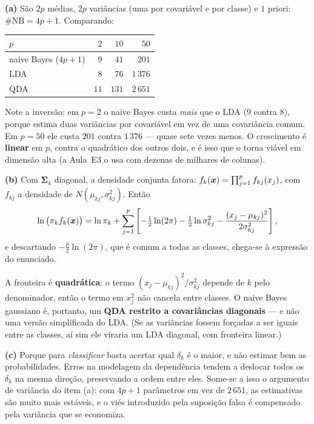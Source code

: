 \documentclass[11pt,a4paper]{article}
\begin{document}
\begin{solucao}
\textbf{(a)} São $2p$ médias, $2p$ variâncias (uma por covariável e por classe) e
$1$ priori: $\#\text{NB}=4p+1$. Comparando:
\begin{center}\small
\renewcommand{\arraystretch}{1.3}
\begin{tabular}{@{}lrrr@{}}
\toprule
$p$ & $2$ & $10$ & $50$ \\
\midrule
naive Bayes ($4p+1$) & $9$  & $41$  & $201$ \\
LDA                  & $8$  & $76$  & $1\,376$ \\
QDA                  & $11$ & $131$ & $2\,651$ \\
\bottomrule
\end{tabular}
\end{center}
Note a inversão: em $p=2$ o naive Bayes custa \emph{mais} que o LDA (9 contra 8),
porque estima duas variâncias por covariável em vez de uma covariância comum. Em
$p=50$ ele custa $201$ contra $1\,376$ --- quase sete vezes menos. O crescimento
é \textbf{linear} em $p$, contra o quadrático dos outros dois, e é isso que o
torna viável em dimensão alta (a Aula~E3 o usa com dezenas de milhares de
colunas).

\smallskip
\textbf{(b)} Com $\bm\Sigma_k$ diagonal, a densidade conjunta fatora:
$f_k(\bm{x})=\prod_{j=1}^p f_{kj}(x_j)$, com
$f_{kj}$ a densidade de $N(\mu_{kj},\sigma_{kj}^2)$. Então
\[
  \ln\big(\pi_k f_k(\bm{x})\big)
   = \ln\pi_k + \sum_{j=1}^{p}\left[
       -\tfrac12\ln(2\pi) - \tfrac12\ln\sigma_{kj}^2
       - \frac{(x_j-\mu_{kj})^2}{2\sigma_{kj}^2}\right],
\]
e descartando $-\tfrac p2\ln(2\pi)$, que é comum a todas as classes, chega-se à
expressão do enunciado.

A fronteira é \textbf{quadrática}: o termo $(x_j-\mu_{kj})^2/\sigma_{kj}^2$
depende de $k$ pelo denominador, então o termo em $x_j^2$ não cancela entre
classes. O naive Bayes gaussiano é, portanto, um \textbf{QDA restrito a
covariâncias diagonais} --- e não uma versão simplificada do LDA. (Se as
variâncias fossem forçadas a ser iguais entre as classes, aí sim ele viraria um
LDA diagonal, com fronteira linear.)

\smallskip
\textbf{(c)} Porque para \emph{classificar} basta acertar qual $\delta_k$ é o
maior, e não estimar bem as probabilidades. Erros na modelagem da dependência
tendem a deslocar todos os $\delta_k$ na mesma direção, preservando a ordem entre
eles. Some-se a isso o argumento de variância do item (a): com $4p+1$ parâmetros
em vez de $2\,651$, as estimativas são muito mais estáveis, e o viés introduzido
pela suposição falsa é compensado pela variância que se economiza.


\end{solucao}
\end{document}
